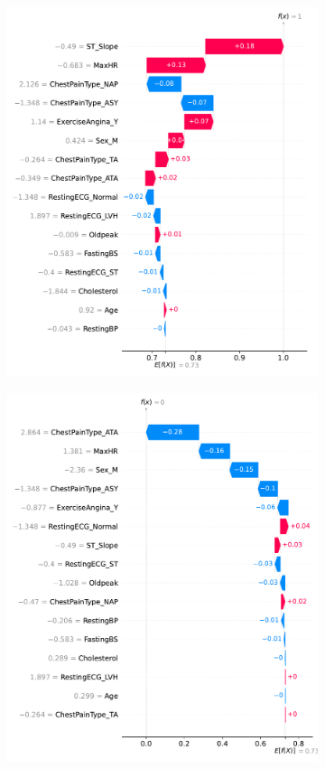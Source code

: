 \begin{figure}
    \centering
    \begin{subfigure}{1\columnwidth}
        \includegraphics[width=1\textwidth]{images/shap_sample_positive_1.pdf}
        \caption{}
        \label{fig:shap_sample_positive_1}
    \end{subfigure}
    \begin{subfigure}{1\columnwidth}
        \includegraphics[width=1\textwidth]{images/shap_sample_positive_2.pdf}

\end{subfigure}
\end{figure}
